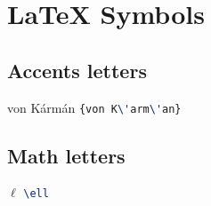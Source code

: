 
\chapter{\LaTeX{} Symbols}

\section{Accents letters}
{von K\'arm\'an} \lstinline[language=TeX]|{von K\'arm\'an}|

\section{Math letters}

$ \ell $ \lstinline[language=TeX]|\ell|

